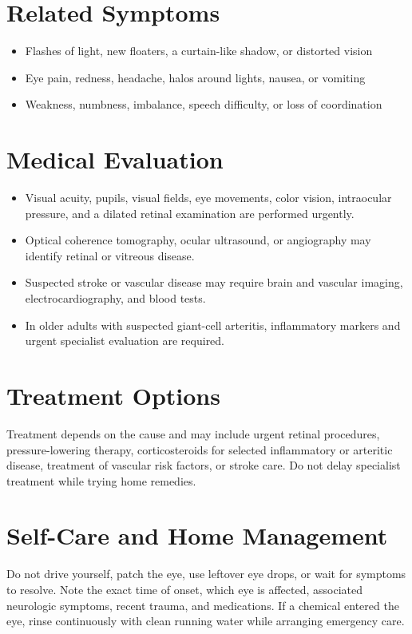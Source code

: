 \section*{Related Symptoms}
\begin{itemize}
  \item Flashes of light, new floaters, a curtain-like shadow, or distorted vision
  \item Eye pain, redness, headache, halos around lights, nausea, or vomiting
  \item Weakness, numbness, imbalance, speech difficulty, or loss of coordination
\end{itemize}

\section*{Medical Evaluation}
\begin{itemize}
  \item Visual acuity, pupils, visual fields, eye movements, color vision, intraocular pressure, and a dilated retinal examination are performed urgently.
  \item Optical coherence tomography, ocular ultrasound, or angiography may identify retinal or vitreous disease.
  \item Suspected stroke or vascular disease may require brain and vascular imaging, electrocardiography, and blood tests.
  \item In older adults with suspected giant-cell arteritis, inflammatory markers and urgent specialist evaluation are required.
\end{itemize}

\section*{Treatment Options}
Treatment depends on the cause and may include urgent retinal procedures, pressure-lowering therapy, corticosteroids for selected inflammatory or arteritic disease, treatment of vascular risk factors, or stroke care. Do not delay specialist treatment while trying home remedies.

\section*{Self-Care and Home Management}
Do not drive yourself, patch the eye, use leftover eye drops, or wait for symptoms to resolve. Note the exact time of onset, which eye is affected, associated neurologic symptoms, recent trauma, and medications. If a chemical entered the eye, rinse continuously with clean running water while arranging emergency care.

